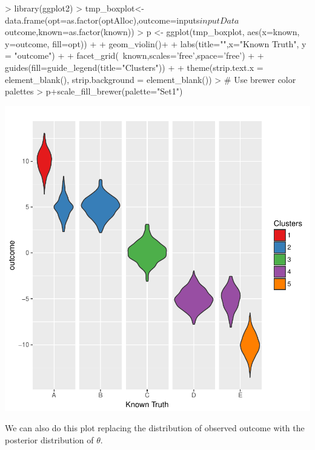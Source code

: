 \documentclass{article}
\begin{document}
\begin{Schunk}
\begin{Sinput}
> library(ggplot2)    
> tmp_boxplot<-data.frame(opt=as.factor(optAlloc),outcome=inputs$inputData$outcome,known=as.factor(known))
> p <- ggplot(tmp_boxplot, aes(x=known, y=outcome, fill=opt)) + 
+   geom_violin()+
+   labs(title="",x="Known Truth", y = "outcome") +
+   facet_grid(~known,scales='free',space='free') + 
+   guides(fill=guide_legend(title="Clusters")) +
+   theme(strip.text.x = element_blank(), strip.background = element_blank()) 
> # Use brewer color palettes
> p+scale_fill_brewer(palette="Set1")
\end{Sinput}
\end{Schunk}
\includegraphics{Fig-test2}

We can also do this plot replacing the distribution of observed outcome with the posterior distribution of $\theta$. 
\end{document}
